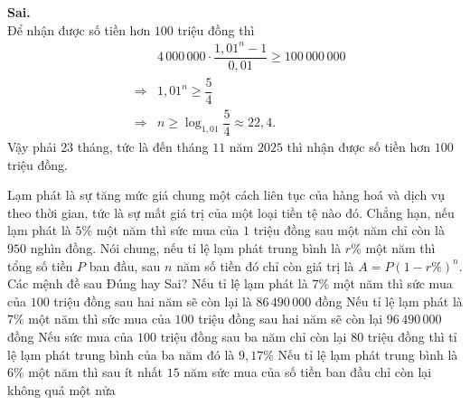 \begin{ex}
{\begin{itemchoice}
    \itemch \textbf{Sai.}\\
   Để nhận được số tiền  hơn $100$ triệu đồng thì
    \allowdisplaybreaks
   \begin{eqnarray*}
     && 4\,000\,000\cdot \dfrac{1{,}01^n-1}{0{,}01} \geq 100\,000\,000\\
    &\Rightarrow& 1{,}01^n \geq \dfrac{5}{4}  \\
    &\Rightarrow& n \geq \log_{1{,}01} \dfrac{5}{4} \approx 22{,}4. 
   \end{eqnarray*}
   Vậy phải $23$ tháng, tức là đến tháng $11$ năm $2025$ thì nhận được  số tiền hơn $100$ triệu đồng.
  \end{itemchoice}
  }
\end{ex}

\begin{ex}%
 Lạm phát là sự tăng mức giá chung một cách liên  tục của hàng hoá và dịch vụ theo thời gian, tức là sự mất giá trị của một loại tiền tệ nào đó. Chẳng hạn, nếu lạm phát là $5 \%$ một năm thì sức mua của $1$ triệu đồng sau một năm chỉ còn là $950$ nghìn đồng. Nói chung, nếu tỉ lệ lạm phát trung bình là $r \%$ một năm thì tổng số tiền $P$ ban đầu, sau $n$ năm số tiền đó chỉ còn giá trị là $A=P\left(1-r \% \right)^n$. Các mệnh đề sau Đúng hay Sai?
 \choiceTF 
  {\True Nếu tỉ lệ lạm phát  là $7 \%$ một năm thì sức mua của $100$ triệu đồng sau hai năm sẽ còn lại là $86\,490\,000$ đồng}
  {Nếu tỉ lệ lạm phát là $7 \%$ một năm thì sức mua của $100$ triệu đồng sau hai năm sẽ còn lại  $96\,490\,000$ đồng}
  {Nếu sức mua của $100$ triệu đồng sau  ba năm chỉ còn lại $80$ triệu đồng thì tỉ lệ lạm phát trung bình của ba năm đó là $9{,}17 \%$}
  {Nếu tỉ lệ lạm phát trung bình là $6 \%$ một năm thì sau ít nhất $15$ năm sức mua của số tiền ban đầu  chỉ còn lại không quá một nửa}
\end{ex}

